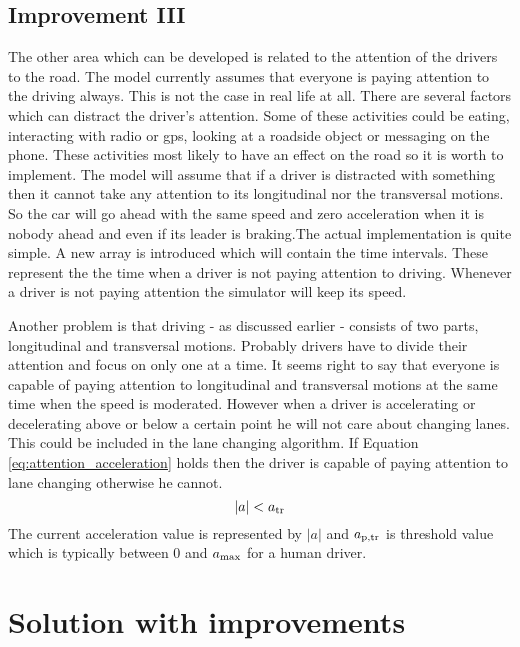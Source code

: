 		\subsection{Improvement III}
		The other area which can be developed is related to the attention of the drivers to the road. The model currently assumes that everyone is paying attention to the driving always. This is not the case in real life at all. There are several factors which can distract the driver's attention. Some of these activities could be eating, interacting with radio or gps, looking at a roadside object or messaging on the phone. These activities most likely to have an effect on the road so it is worth to implement. The model will assume that if a driver is distracted with something then it cannot take any attention to its longitudinal nor the transversal motions. So the car will go ahead with the same speed and zero acceleration when it is nobody ahead and even if its leader is braking.The actual implementation is quite simple. A new array is introduced which will contain the time intervals. These represent the the time when a driver is not paying attention to driving. Whenever a driver is not paying attention the simulator will keep its speed.

		 Another problem is that driving - as discussed earlier - consists of two parts, longitudinal and transversal motions. Probably drivers have to divide their attention and focus on only one at a time. It seems right to say that everyone is capable of paying attention to longitudinal and transversal motions at the same time when the speed is moderated. However when a driver is accelerating or decelerating above or below a certain point he will not care about changing lanes. This could be included in the lane changing algorithm. If Equation \ref{eq:attention_acceleration}  holds then the driver is capable of paying attention to lane changing otherwise he cannot.
		\begin{equation}
			|a|<a_{\rm tr}
			\label{eq:attention_acceleration}
		\end{equation}
		The current acceleration value is represented by $|a|$ and $a_{\rm p,tr}$ is threshold value which is typically between 0 and $a_{\rm max}$ for a human driver.
	\section{Solution with improvements}
